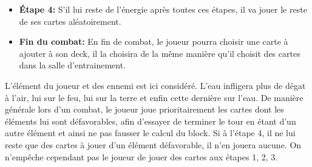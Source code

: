 \begin{itemize}
\begin{itemize}
                \item \textbf{\'Etape 4:} S'il lui reste de l'énergie après toutes ces étapes, il va jouer le reste de ses cartes aléatoirement.
                \item \textbf{Fin du combat:} En fin de combat, le joueur pourra choisir une carte à ajouter à son deck, il la choisira de la m\^eme manière qu'il choisit des cartes dans la salle d'entrainement.
            \end{itemize}
            L'élément du joueur et des ennemi est ici considéré. L'eau infligera plus de dégat à l'air, lui sur le feu, lui sur la terre et enfin cette dernière sur l'eau. De manière générale lors d'un combat, le joueur joue prioritairement les cartes dont les éléments lui sont défavorables, afin d'essayer de terminer le tour en étant d'un autre élément et ainsi ne pas fausser le calcul du block. Si à l'étape 4, il ne lui reste que des cartes à jouer d'un élément défavorable, il n'en jouera aucune. On n'empêche cependant pas le joueur de jouer des cartes aux étapes 1, 2, 3.
        \end{itemize}
        
